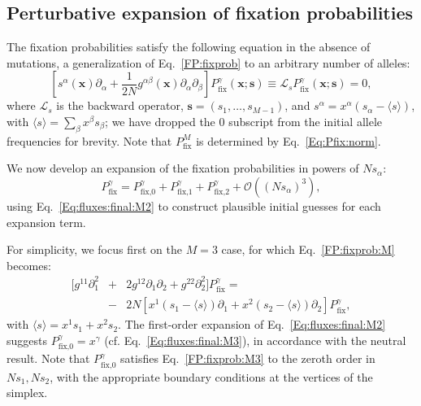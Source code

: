 \documentclass[9pt,twocolumn,twoside]{gsajnl}
\newcommand{\Lop}{\mathcal L}
\begin{document}
\subsection{Perturbative expansion of fixation probabilities}
The fixation probabilities satisfy the following equation in the absence of mutations, a generalization of Eq.~\eqref{FP:fixprob} to an arbitrary number of alleles:
\begin{equation} \label{FP:fixprob:M}
\left[ s^\alpha (\mathbf{x}) \partial_\alpha + \frac{1}{2N} g^{\alpha \beta} (\mathbf{x}) \partial_{\alpha} \partial_{\beta} \right] P_{\text{fix}}^{\gamma} (\mathbf{x}; \mathbf{s}) \equiv
\Lop_s P_{\text{fix}}^{\gamma} (\mathbf{x}; \mathbf{s}) = 0,
\end{equation}
where $\Lop_s$ is the backward operator, $\mathbf{s} = (s_1, \ldots, s_{M-1})$, %
and $s^\alpha = x^\alpha (s_\alpha - \langle s \rangle)$, with $\langle s \rangle = \sum_{\beta} x^\beta s_\beta$;
we have dropped the $0$ subscript from the initial allele frequencies for brevity.
Note that $P_{\text{fix}}^{M}$ is determined by Eq.~\eqref{Eq:Pfix:norm}.

We now develop an expansion of the fixation probabilities in powers of $N s_\alpha$:
\begin{equation} \label{Pfix:expan}
P_{\text{fix}}^{\gamma} = P_{\text{fix,0}}^{\gamma} + P_{\text{fix,1}}^{\gamma} + P_{\text{fix,2}}^{\gamma} + \mathcal{O} ((N s_\alpha)^3),
\end{equation}
using Eq.~\eqref{Eq:fluxes:final:M2} to construct plausible initial guesses for each expansion term.

For simplicity, we focus first on the $M=3$ case, for which Eq.~\eqref{FP:fixprob:M} becomes:
\begin{eqnarray} \label{FP:fixprob:M3}
[ g^{11} \partial^2_1 &+& 2 g^{12} \partial_1 \partial_2 + g^{22} \partial^2_2 ] P_{\text{fix}}^{\gamma} = \nonumber \\
&-&2N [ x^1 (s_1 - \langle s \rangle) \partial_1 + x^2 (s_2 - \langle s \rangle) \partial_2 ] P_{\text{fix}}^{\gamma},
\end{eqnarray}
with $\langle s \rangle = x^1 s_1 + x^2 s_2$. The first-order expansion of Eq.~\eqref{Eq:fluxes:final:M2} suggests $P_{\text{fix,0}}^{\gamma} = x^\gamma$ (cf. Eq.~\eqref{Eq:fluxes:final:M3}),
in accordance with the neutral result. Note that $P_{\text{fix,0}}^{\gamma}$ satisfies Eq.~\eqref{FP:fixprob:M3} to the zeroth order in $Ns_1,Ns_2$, with the appropriate boundary conditions at the vertices
of the simplex.
\end{document}
